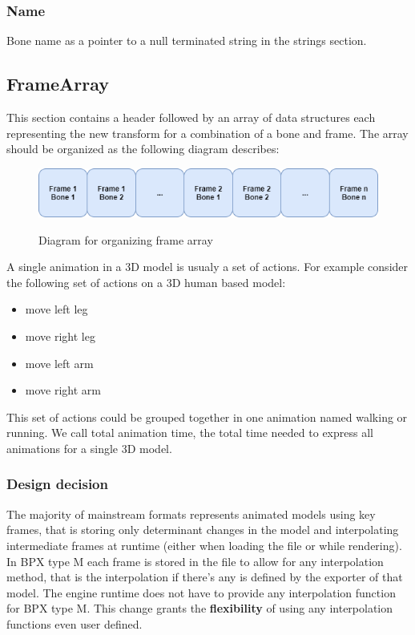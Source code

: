 \subsubsection{Name}
Bone name as a pointer to a null terminated string in the strings section.

\subsection{FrameArray}
This section contains a header followed by an array of data structures each representing the new transform for a combination of a bone and frame.\newline
The array should be organized as the following diagram describes:
\begin{figure}[h!]
    \centering
    \includegraphics[scale=0.7]{Types/FrameArray_Diagram.png}
    \label{fig:FrameArray_Diagram}
    \caption{Diagram for organizing frame array}
\end{figure}
\newline
A single animation in a 3D model is usualy a set of actions. For example consider the following set of actions on a 3D human based model:
\begin{itemize}
    \item move left leg
    \item move right leg
    \item move left arm
    \item move right arm
\end{itemize}
This set of actions could be grouped together in one animation named walking or running.\newline
We call total animation time, the total time needed to express all animations for a single 3D model.

\subsubsection{Design decision}
The majority of mainstream formats represents animated models using key frames, that is storing only determinant changes in the model and interpolating intermediate frames at runtime (either when loading the file or while rendering). In BPX type M each frame is stored in the file to allow for any interpolation method, that is the interpolation if there's any is defined by the exporter of that model. The engine runtime does not have to provide any interpolation function for BPX type M.\newline
This change grants the \textbf{flexibility} of using any interpolation functions even user defined.

